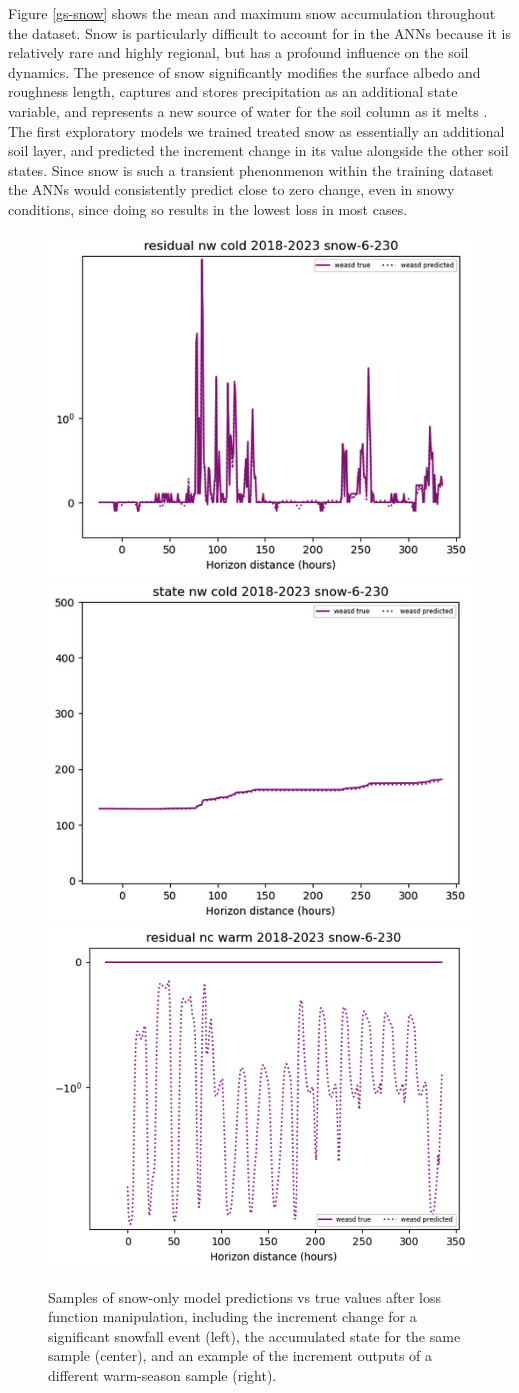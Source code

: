 Figure \ref{gs-snow} shows the mean and maximum snow accumulation throughout the dataset. Snow is particularly difficult to account for in the ANNs because it is relatively rare and highly regional, but has a profound influence on the soil dynamics. The presence of snow significantly modifies the surface albedo and roughness length, captures and stores precipitation as an additional state variable, and represents a new source of water for the soil column as it melts \citep{koren_parameterization_1999}. The first exploratory models we trained treated snow as essentially an additional soil layer, and predicted the increment change in its value alongside the other soil states. Since snow is such a transient phenonmenon within the training dataset the ANNs would consistently predict close to zero change, even in snowy conditions, since doing so results in the lowest loss in most cases.

\begin{figure}[hb!]
    \centering
    \includegraphics[width=.32\linewidth]{figures/snow-sample_res.png}
    \includegraphics[width=.32\linewidth]{figures/snow-sample_state.png}
    \includegraphics[width=.32\linewidth]{figures/snow-sample_warm.png}
    \caption{Samples of snow-only model predictions vs true values after loss function manipulation, including the increment change for a significant snowfall event (left), the accumulated state for the same sample (center), and an example of the increment outputs of a different warm-season sample (right).}
    \label{snow-models}
\end{figure}

